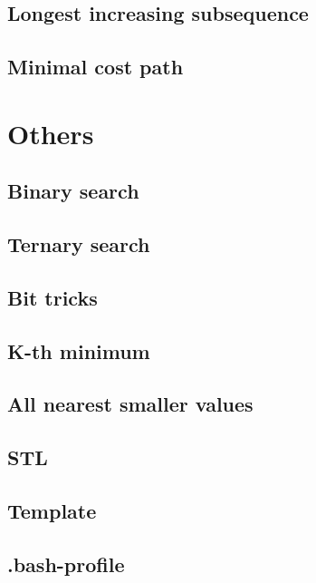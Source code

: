 \documentclass[a4paper]{article}
\begin{document}
\begin{multicols*}{2}
    \subsection{Longest increasing subsequence}
        
    \subsection{Minimal cost path}
        

\section{Others}
    \subsection{Binary search}
        
    \subsection{Ternary search}
        
    \subsection{Bit tricks}
        
    \subsection{K-th minimum}
        
    \subsection{All nearest smaller values}
        
    \subsection{STL}
        
    \subsection{Template}
        
    \subsection{.bash-profile}
        

\end{multicols*}
\end{document}
